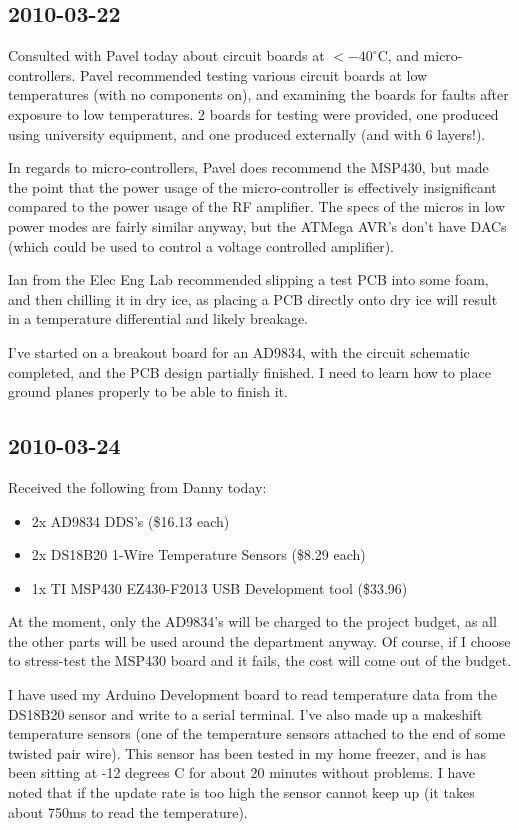 \documentclass[a4paper,10pt]{article}
\begin{document}
\subsection{2010-03-22}
Consulted with Pavel today about circuit boards at $<-40^\circ$C, and micro-controllers. Pavel recommended testing various circuit boards at low temperatures (with no components on), and examining the boards for faults after exposure to low temperatures. 2 boards for testing were provided, one produced using university equipment, and one produced externally (and with 6 layers!). 

In regards to micro-controllers, Pavel does recommend the MSP430, but made the point that the power usage of the micro-controller is effectively insignificant compared to the power usage of the RF amplifier. The specs of the micros in low power modes are fairly similar anyway, but the ATMega AVR's don't have DACs (which could be used to control a voltage controlled amplifier). 

Ian from the Elec Eng Lab recommended slipping a test PCB into some foam, and then chilling it in dry ice, as placing a PCB directly onto dry ice will result in a temperature differential and likely breakage.

I've started on a breakout board for an AD9834, with the circuit schematic completed, and the PCB design partially finished. I need to learn how to place ground planes properly to be able to finish it.

\subsection{2010-03-24}
Received the following from Danny today:
\begin{itemize}
\item 2x AD9834 DDS's (\$16.13 each)
\item 2x DS18B20 1-Wire Temperature Sensors (\$8.29 each)
\item 1x TI MSP430 EZ430-F2013 USB Development tool (\$33.96)
\end{itemize}

At the moment, only the AD9834's will be charged to the project budget, as all the other parts will be used around the department anyway. Of course, if I choose to stress-test the MSP430 board and it fails, the cost will come out of the budget.

I have used my Arduino Development board to read temperature data from the DS18B20 sensor and write to a serial terminal. I've also made up a makeshift temperature sensors (one of the temperature sensors attached to the end of some twisted pair wire). This sensor has been tested in my home freezer, and is has been sitting at -12 degrees C for about 20 minutes without problems. I have noted that if the update rate is too high the sensor cannot keep up (it takes about 750ms to read the temperature).
\end{document}
